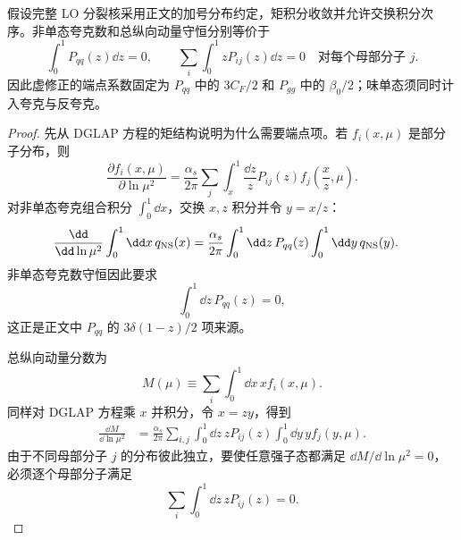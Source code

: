 \begin{proposition}
假设完整 LO 分裂核采用正文的加号分布约定，矩积分收敛并允许交换积分次序。非单态夸克数和总纵向动量守恒分别等价于
\[
\int_0^1P_{qq}(z)\dd z=0,\qquad
\sum_i\int_0^1zP_{ij}(z)\dd z=0\quad\text{对每个母部分子 }j.
\]
因此虚修正的端点系数固定为 $P_{qq}$ 中的 $3C_F/2$ 和 $P_{gg}$ 中的 $\beta_0/2$；味单态须同时计入夸克与反夸克。
\end{proposition}
\begin{proof}
先从 DGLAP 方程的矩结构说明为什么需要端点项。若 $f_i(x,\mu)$ 是部分子分布，则
\begin{equation*}
 \frac{\partial f_i(x,\mu)}{\partial\ln\mu^2}
 =\frac{\alpha_s}{2\pi}
 \sum_j\int_x^1\frac{\dd z}{z}
 P_{ij}(z)f_j\!\left(\frac{x}{z},\mu\right).
\end{equation*}
对非单态夸克组合积分 $\int_0^1\dd x$，交换 $x,z$ 积分并令 $y=x/z$：
\begin{align*}
 \frac{\dd}{\dd\ln\mu^2}\int_0^1\dd x\,q_{\rm NS}(x)
 &=\frac{\alpha_s}{2\pi}
 \int_0^1\dd z\,P_{qq}(z)
 \int_0^1\dd y\,q_{\rm NS}(y).
\end{align*}
非单态夸克数守恒因此要求
\begin{equation*}
 \int_0^1\dd z\,P_{qq}(z)=0,
\end{equation*}
这正是正文中 $P_{qq}$ 的 $3\delta(1-z)/2$ 项来源。

总纵向动量分数为
\begin{equation*}
 M(\mu)\equiv\sum_i\int_0^1\dd x\,x f_i(x,\mu).
\end{equation*}
同样对 DGLAP 方程乘 $x$ 并积分，令 $x=zy$，得到
\begin{align*}
 \frac{\dd M}{\dd\ln\mu^2}
 &=\frac{\alpha_s}{2\pi}
 \sum_{i,j}\int_0^1\dd z\,zP_{ij}(z)
 \int_0^1\dd y\,y f_j(y,\mu).
\end{align*}
由于不同母部分子 $j$ 的分布彼此独立，要使任意强子态都满足 $\dd M/\dd\ln\mu^2=0$，必须逐个母部分子满足
\begin{equation*}
 \sum_i\int_0^1\dd z\,zP_{ij}(z)=0.
\end{equation*}


\end{proof}
